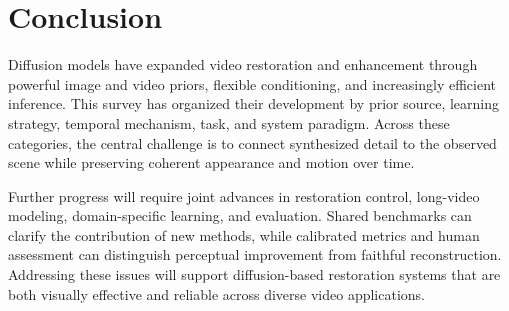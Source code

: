 \section{Conclusion}
Diffusion models have expanded video restoration and enhancement through powerful image and video priors, flexible conditioning, and increasingly efficient inference. This survey has organized their development by prior source, learning strategy, temporal mechanism, task, and system paradigm. Across these categories, the central challenge is to connect synthesized detail to the observed scene while preserving coherent appearance and motion over time.

Further progress will require joint advances in restoration control, long-video modeling, domain-specific learning, and evaluation. Shared benchmarks can clarify the contribution of new methods, while calibrated metrics and human assessment can distinguish perceptual improvement from faithful reconstruction. Addressing these issues will support diffusion-based restoration systems that are both visually effective and reliable across diverse video applications.

